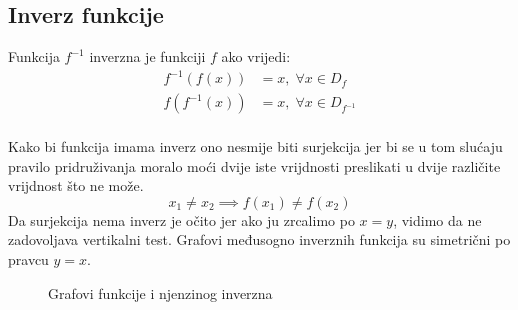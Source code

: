 \subsection{Inverz funkcije}
    Funkcija \(f^{-1}\) inverzna je funkciji \(f\) ako vrijedi:
    \begin{equation*}
        \begin{split}
            f^{-1}(f(x)) &= x,\; \forall x\in D_f \\
            f(f^{-1}(x)) &= x,\; \forall x\in D_{f^{-1}}
        \end{split}
    \end{equation*}
    \\
    Kako bi funkcija imama inverz ono nesmije biti surjekcija jer bi se u tom slućaju pravilo pridruživanja moralo moći dvije iste vrijdnosti preslikati u dvije različite vrijdnost što ne može.
    \[x_1 \neq x_2 \implies f(x_1) \neq f(x_2)\]
    Da surjekcija nema inverz je očito jer ako ju zrcalimo po \(x = y\), vidimo da ne zadovoljava vertikalni test.
    Grafovi međusogno inverznih funkcija su simetrični po pravcu \(y = x\).
    \begin{figure}[ht]
        \centering
        \caption{Grafovi funkcije i njenzinog inverzna} 
        \label{fig:template}
    \end{figure}